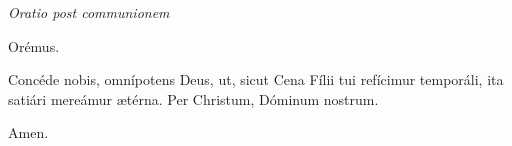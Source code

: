 \textit{Oratio post communionem}

Orémus.

Concéde nobis, omnípotens Deus, ut, sicut Cena Fílii tui refícimur temporáli, ita satiári mereámur ætérna. Per Christum, Dóminum nostrum.

\Rbardot{} Amen.
